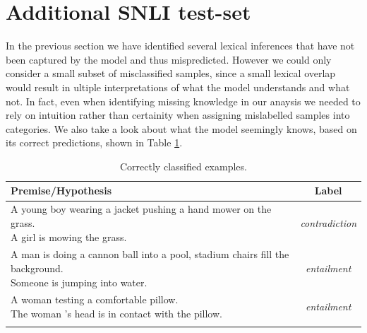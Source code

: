\section{Additional SNLI test-set}\label{sec:additional_snli_set}
In the previous section we have identified several lexical inferences that have not been captured by the model and thus mispredicted.  However we could only consider a small subset of misclassified samples, since a small lexical overlap would result in ultiple interpretations of what the model understands and what not. In fact, even when identifying missing knowledge in our anaysis we needed to rely on intuition rather than certainity when assigning mislabelled samples into categories. We also take a look about what the model seemingly knows, based on its correct predictions, shown in Table \ref{table:correct_samples}.
\begin{table}[!htbp]
\begin{center}
\begin{tabular}{lc}
\textbf{Premise/Hypothesis} & \textbf{Label} \\
\toprule
\specialcell{A young boy wearing a jacket pushing a hand mower on the grass.\\A girl is mowing the grass.} & \textit{contradiction} \\
\midrule
\specialcell{A man is doing a cannon ball into a pool, stadium chairs fill the background.\\Someone is jumping into water.} & \textit{entailment} \\
\midrule
\specialcell{A woman testing a comfortable pillow.\\The woman 's head is in contact with the pillow.} & \textit{entailment} \\
\bottomrule
\label{table:correct_samples}
\end{tabular}
\caption{Correctly classified examples.}
\end{center}
\end{table}
